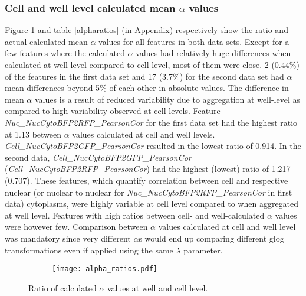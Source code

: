 \documentclass[11pt]{article}
\begin{document}
\subsubsection{Cell and well level calculated mean $\alpha$ values }
\par{Figure \ref{alpharatiosfig} and table \ref{alpharatios} (in Appendix) respectively show the ratio and actual calculated mean $\alpha$ values for all features in both data sets. Except for a few features where the calculated $\alpha$ values had relatively huge differences when calculated at well level compared to cell level, most of them were close. 2 (0.44\%) of the features in the first data set and 17 (3.7\%) for the second data set had $\alpha$ mean differences beyond 5\% of each other in absolute values. 
The difference in mean $\alpha$ values is a result of reduced variability due to aggregation at well-level as compared to high variability observed at cell levels. Feature \textit{Nuc\_NucCytoBFP2RFP\_PearsonCor} for the first data set had the highest ratio at 1.13 between $\alpha$ values calculated at cell and well levels. \textit{Cell\_NucCytoBFP2GFP\_PearsonCor} resulted in the lowest ratio of 0.914. In the second data, \textit{Cell\_NucCytoBFP2GFP\_PearsonCor} (\textit{Cell\_NucCytoBFP2RFP\_PearsonCor}) had the highest (lowest) ratio of 1.217 (0.707). These features, which quantify correlation between cell and respective nuclear (or nuclear to nuclear for \textit{Nuc\_NucCytoBFP2RFP\_PearsonCor} in first data) cytoplasms, were highly variable at cell level compared to when aggregated at well level. Features with high ratios between cell- and well-calculated $\alpha$ values were however few. Comparison between $\alpha$ values calculated at cell and well level was mandatory since very different $\alpha$s would end up comparing different glog transformations even if applied using the same $\lambda$ parameter.
} 
\\

\begin{figure}[ht!] 
\centering
  \begin{subfigure}[b]{0.8\linewidth}
    \centering
    \texttt{[image: alpha\_ratios.pdf]} 
     \vspace{1ex}
  \end{subfigure}%
  \caption{Ratio of calculated $\alpha$ values at well and cell level.}
  \label{alpharatiosfig} 
\end{figure}

\vspace{2cm}
\end{document}
